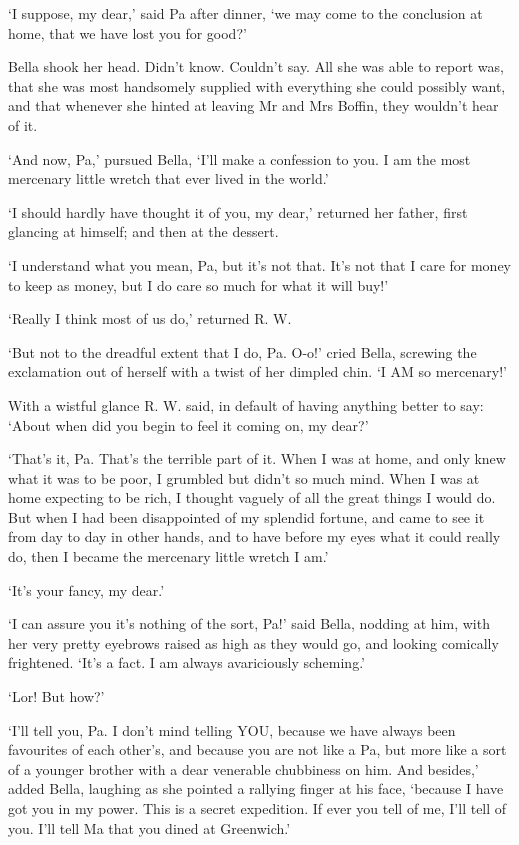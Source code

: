 ‘I suppose, my dear,’ said Pa after dinner, ‘we may come to the
conclusion at home, that we have lost you for good?’

Bella shook her head. Didn’t know. Couldn’t say. All she was able to
report was, that she was most handsomely supplied with everything she
could possibly want, and that whenever she hinted at leaving Mr and Mrs
Boffin, they wouldn’t hear of it.

‘And now, Pa,’ pursued Bella, ‘I’ll make a confession to you. I am the
most mercenary little wretch that ever lived in the world.’

‘I should hardly have thought it of you, my dear,’ returned her father,
first glancing at himself; and then at the dessert.

‘I understand what you mean, Pa, but it’s not that. It’s not that I care
for money to keep as money, but I do care so much for what it will buy!’

‘Really I think most of us do,’ returned R. W.

‘But not to the dreadful extent that I do, Pa. O-o!’ cried Bella,
screwing the exclamation out of herself with a twist of her dimpled
chin. ‘I AM so mercenary!’

With a wistful glance R. W. said, in default of having anything better
to say: ‘About when did you begin to feel it coming on, my dear?’

‘That’s it, Pa. That’s the terrible part of it. When I was at home, and
only knew what it was to be poor, I grumbled but didn’t so much mind.
When I was at home expecting to be rich, I thought vaguely of all the
great things I would do. But when I had been disappointed of my splendid
fortune, and came to see it from day to day in other hands, and to have
before my eyes what it could really do, then I became the mercenary
little wretch I am.’

‘It’s your fancy, my dear.’

‘I can assure you it’s nothing of the sort, Pa!’ said Bella, nodding at
him, with her very pretty eyebrows raised as high as they would go, and
looking comically frightened. ‘It’s a fact. I am always avariciously
scheming.’

‘Lor! But how?’

‘I’ll tell you, Pa. I don’t mind telling YOU, because we have always
been favourites of each other’s, and because you are not like a Pa, but
more like a sort of a younger brother with a dear venerable chubbiness
on him. And besides,’ added Bella, laughing as she pointed a rallying
finger at his face, ‘because I have got you in my power. This is a
secret expedition. If ever you tell of me, I’ll tell of you. I’ll tell
Ma that you dined at Greenwich.’

